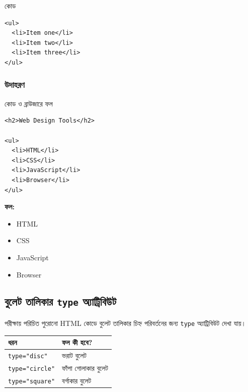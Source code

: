\begin{examplebox}{কোড}
\par\noindent\begin{minipage}{\linewidth}
\begin{verbatim}
<ul>
  <li>Item one</li>
  <li>Item two</li>
  <li>Item three</li>
</ul>
\end{verbatim}
\end{minipage}\par
\end{examplebox}

\subsubsection{উদাহরণ}

\begin{chFourWholeExample}{কোড ও ব্রাউজারে ফল}
\noindent
\begin{minipage}[t]{.50\linewidth}\vspace{0pt}

\begin{verbatim}
<h2>Web Design Tools</h2>

<ul>
  <li>HTML</li>
  <li>CSS</li>
  <li>JavaScript</li>
  <li>Browser</li>
</ul>
\end{verbatim}

\end{minipage}\hfill
\begin{minipage}[t]{.46\linewidth}\vspace{0pt}
\textbf{ফল:}
\begin{itemize}
\item HTML
\item CSS
\item JavaScript
\item Browser
\end{itemize}
\end{minipage}
\end{chFourWholeExample}

\subsection{বুলেট তালিকার \texttt{type} অ্যাট্রিবিউট}

পরীক্ষায় পরিচিত পুরোনো HTML কোডে বুলেট তালিকার চিহ্ন পরিবর্তনের জন্য \texttt{type} অ্যাট্রিবিউট দেখা যায়।

\begin{center}
\begin{tabular}{|p{}|p{}|}
\hline
\textbf{ধরন} & \textbf{ফল কী হবে?} \\
\hline
\texttt{type="disc"} & ভরাট বুলেট \\
\hline
\texttt{type="circle"} & ফাঁপা গোলাকার বুলেট \\
\hline
\texttt{type="square"} & বর্গাকার বুলেট \\
\hline
\end{tabular}
\end{center}

